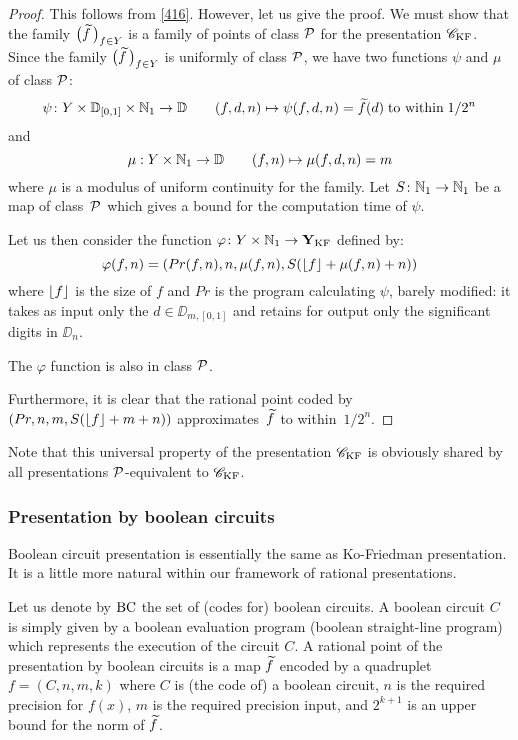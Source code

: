 \begin{proof} 
This follows from \ref{416}. However, let us give the proof. We must show that the family $\big(\widetilde{f}\,\big)_{f \in Y}$ is a family of points of class ${\cal P}$ for the presentation ${{{\mathscr C}}_{\rm KF}}$. Since the family $\big(\widetilde{f}\,\big)_{f \in Y}$ is uniformly of class ${\cal P}$, we have two functions $\psi$ and $\mu$ of class 
${\cal P}$:
\[
 \psi\colon Y \times \mathbb {D}_{[0,1]} \times \mathbb {N}_1 \to \mathbb {D} \qquad  
(f,d,n) \mapsto \psi(f,d,n) = \widetilde{f}(d) \; \hbox{to within} \; 1/2^n
\]
and 			
\[
\mu: Y \times \mathbb {N}_1 \to \mathbb {D} \qquad (f,n) \mapsto \mu(f,d,n) = m 
\]
where $\mu$ is a modulus of uniform continuity for the family. 
Let $S\colon \mathbb {N}_1 \to \mathbb {N}_1$ be a map of class~${\cal P}$ which gives a bound for the computation time of $\psi$. 

\noindent 
Let us then consider the function $\varphi\colon Y \times \mathbb {N}_1 \to {{\bf Y}_{\rm KF}} $ defined by:
\[
\varphi(f,n) = (Pr(f,n), n, \mu(f,n), S(\lfloor f \rfloor + \mu(f,n) + n))
\]
where $\lfloor f \rfloor$ is the size of $f$ and $Pr$ is the program calculating 
$\psi$, barely modified: 
it takes as input only the $d \in \DD_{m,[0,1]}$ and retains for output only the significant digits in $\DD_n$.

\noindent 
The $\varphi$ function is also in  class ${\cal P}$. 

\noindent 
Furthermore, it is clear that the rational point coded by $(Pr,n,m,S(\lfloor f \rfloor +m+n))$ approximates~$\widetilde  f$ to within~$1/2^n$. 	 
\end{proof}

Note that this universal property of the presentation ${{{\mathscr C}}_{\rm KF}}$ is obviously shared by all presentations ${\cal P}$-equivalent to ${{{\mathscr C}}_{\rm KF}}$.

\subsubsection{Presentation by boolean circuits} \label{subsubsec412}

Boolean circuit presentation is essentially the same as Ko-Friedman presentation. It is a little more natural within our framework of rational 
presentations. 

Let us denote by ${\rm BC}$ the set of (codes for) boolean circuits. A boolean circuit $C$ is simply given by a boolean evaluation program (boolean straight-line program) which represents the execution of the circuit $C$.
A rational point of the presentation by boolean circuits is a map $\widetilde{f}$ encoded by a quadruplet $f = (C, n, m, k)$ where $C$ is (the code of) a boolean circuit, $n$ is the required precision for $f(x)$, $m$ is the required precision input, and $2^{k+1}$ is an upper bound for the norm of $\widetilde{f}$. 

